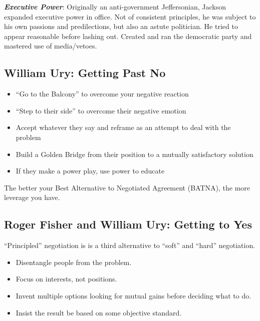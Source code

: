 \documentclass[
]{article}
\begin{document}
\textbf{\emph{Executive Power}}: Originally an anti-government
Jeffersonian, Jackson expanded executive power in office. Not of
consistent principles, he was subject to his own passions and
predilections, but also an astute politician. He tried to appear
reasonable before lashing out. Created and ran the democratic party and
mastered use of media/vetoes.

\hypertarget{william-ury-getting-past-no}{%
\subsection{William Ury: Getting Past
No}\label{william-ury-getting-past-no}}

\begin{itemize}
\item
  ``Go to the Balcony'' to overcome your negative reaction
\item
  ``Step to their side'' to overcome their negative emotion
\item
  Accept whatever they say and reframe as an attempt to deal with the
  problem
\item
  Build a Golden Bridge from their position to a mutually satisfactory
  solution
\item
  If they make a power play, use power to educate
\end{itemize}

The better your Best Alternative to Negotiated Agreement (BATNA), the
more leverage you have.

\hypertarget{roger-fisher-and-william-ury-getting-to-yes}{%
\subsection{Roger Fisher and William Ury: Getting to
Yes}\label{roger-fisher-and-william-ury-getting-to-yes}}

``Principled'' negotiation is is a third alternative to ``soft'' and
``hard'' negotiation.

\begin{itemize}
\item
  Disentangle people from the problem.
\item
  Focus on interests, not positions.
\item
  Invent multiple options looking for mutual gains before deciding what
  to do.
\item
  Insist the result be based on some objective standard.
\end{itemize}
\end{document}
